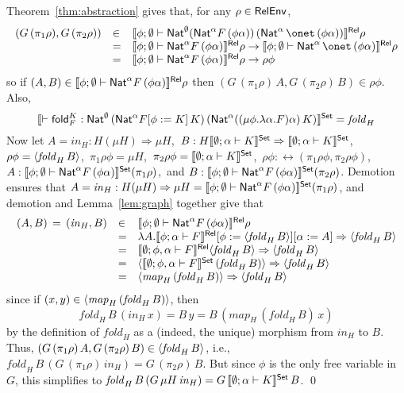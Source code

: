 \documentclass{lmcs}
\theoremstyle{plain}\newtheorem{satz}[thm]{Satz}
\newcommand{\fold}{\mathsf{fold}}
\begin{document}
\proof
Theorem~\ref{thm:abstraction} gives that, for any 
$\rho \in \mathsf{RelEnv}$,
\[\begin{array}{lll}
(G \,(\pi_1 \rho), G\, (\pi_2 \rho)) & \in &
\relsem{\phi;\emptyset\vdash \Nat^{\emptyset} (\Nat^\alpha 
  F\, (\phi\alpha))\, (\Nat^\alpha\,\onet \, (\phi\alpha))}
\rho\\ 
& = & \relsem{\phi;\emptyset\vdash \Nat^\alpha F\,
  (\phi\alpha)}\rho \to \relsem{\phi;\emptyset\vdash
  \Nat^\alpha\,\onet \, (\phi\alpha)}\rho\\ 
& = & \relsem{\phi;\emptyset\vdash \Nat^\alpha F\,
  (\phi\alpha)}\rho \to \rho \phi
\end{array}\]
\noindent
so if $(A, B) \in \llbracket{\phi;\emptyset\vdash \mathsf{Nat}^\alpha F\,
  (\phi\alpha)}\rrbracket^{\mathsf{Rel}}\rho$ then $(G \,(\pi_1 \rho)\, A, G\, (\pi_2 \rho)\,
B) \in \rho \phi$.
Also,
\[\setsem{\vdash \fold_F^K :
  \Nat^{\emptyset}\, (\Nat^\alpha F[\phi := K]\,K)\, (\Nat^\alpha
  ((\mu \phi.\lambda\alpha.F)\alpha)\,K)} = \mathit{fold}_H\]
Now let $A = \mathit{in}_H : H (\mu H) \Rightarrow
\mu H$,\, $B : H\llbracket{\emptyset;\alpha\vdash K}\rrbracket^{\mathsf{Set}} \Rightarrow
\llbracket{\emptyset;\alpha \vdash K}\rrbracket^{\mathsf{Set}}$,\, $\rho \phi =
\langle {\mathit{fold}_H\, B} \rangle$,\, $\pi_1 \rho \phi = \mu H$,\, $\pi_2
\rho \phi = \llbracket{\emptyset;\alpha\vdash K}\rrbracket^{\mathsf{Set}}$,\, $\rho \phi :
\rel(\pi_1 \rho \phi, \pi_2 \rho \phi)$,\, $A : \llbracket{\phi;
  \emptyset \vdash \mathsf{Nat}^\alpha F \, (\phi \alpha)}\rrbracket^{\mathsf{Set}} (\pi_1 \rho)$,\,
and $B : \llbracket{\phi; \emptyset \vdash \mathsf{Nat}^\alpha F \, (\phi
  \alpha)}\rrbracket^{\mathsf{Set}} (\pi_2 \rho)$.
Demotion ensures that $A = \mathit{in}_H : H(\mu H) \Rightarrow \mu H
= \llbracket{\phi;\emptyset \vdash \mathsf{Nat}^\alpha F
  \,(\phi\alpha)}\rrbracket^{\mathsf{Set}}(\pi_1\rho)$,
and demotion and Lemma~\ref{lem:graph} together give that
\[\begin{array}{lll}
(A,B) \,=\, (\mathit{in}_H,B) & \in & \llbracket{\phi;\emptyset\vdash
  \mathsf{Nat}^\alpha F\, (\phi\alpha)}\rrbracket^{\mathsf{Rel}}\rho\\
& = & \lambda A. \llbracket{\phi;\alpha\vdash F}\rrbracket^{\mathsf{Rel}}[\phi :=
  \langle {\mathit{fold}_H\, B} \rangle][\alpha := A] \Rightarrow 
 \langle {\mathit{fold}_H\, B} \rangle \\ 
& = & \llbracket{\emptyset;\phi,\alpha\vdash F}\rrbracket^{\mathsf{Rel}}
  \langle {\mathit{fold}_H\, B} \rangle \Rightarrow \langle {\mathit{fold}_H\,
    B} \rangle\\
  & = & \langle {\llbracket{\emptyset;\phi,\alpha\vdash F}\rrbracket^{\mathsf{Set}}
    \,(\mathit{fold}_H\,B)} \rangle \Rightarrow \langle {\mathit{fold}_H\, B} \rangle\\
  & = & \langle {\mathit{map}_H \,(\mathit{fold}_H\,B)} \rangle \Rightarrow
\langle {\mathit{fold}_H\, B} \rangle\\
\end{array}\]
since if $(x,y) \in \langle {\mathit{map}_H \,(\mathit{fold}_H\,B)} \rangle$,
then $$\mathit{fold}_H\, B\, (\mathit{in}_H\,x) = B\,y = B\,
(\mathit{map}_H \,(\mathit{fold}_H\,B) \, x)$$ by the definition of
$\mathit{fold}_H$ as a (indeed, the unique) morphism from
$\mathit{in}_H$ to $B$.  Thus, $(G \,(\pi_1 \rho)\, A, G\, (\pi_2
\rho)\, B) \in \langle {\mathit{fold}_H\, B} \rangle$, i.e., $\mathit{fold}_H \,
B \, (G\, (\pi_1 \rho) \, \mathit{in}_H) = G\,(\pi_2 \rho)\,B$.  But
since $\phi$ is the only free variable in $G$, this simplifies to
$\mathit{fold}_H\, B \, (G\, \mu H\, \mathit{in}_H) =
G\,\llbracket{\emptyset;\alpha\vdash K}\rrbracket^{\mathsf{Set}}\,B$. \qed
\end{document}
